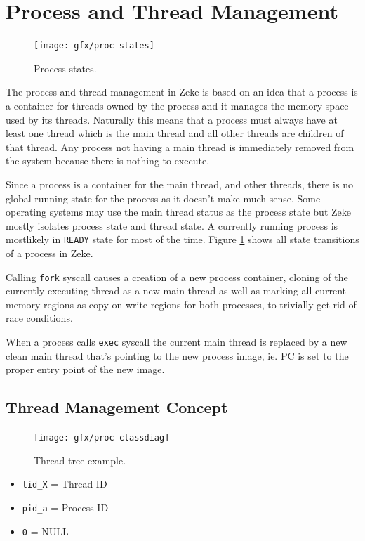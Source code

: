 \part{Process and Thread Management}

\begin{figure}
  \center
  \texttt{[image: gfx/proc-states]}
  \caption{Process states.}
  \label{figure:procstates}
\end{figure}

The process and thread management in Zeke is based on an idea that
a process is a container for threads owned by the process and it manages
the memory space used by its threads. Naturally this means that a process
must always have at least one thread which is the main thread and all other
threads are children of that thread. Any process not having a main thread is
immediately removed from the system because there is nothing to execute.

Since a process is a container for the main thread, and other threads, there
is no global running state for the process as it doesn't make much sense.
Some operating systems may use the main thread status as the process state
but Zeke mostly isolates process state and thread state. A currently running
process is mostlikely in \verb+READY+ state for most of the time. Figure
\ref{figure:procstates} shows all state transitions of a process in Zeke.

Calling \verb+fork+ syscall causes a creation of a new process container,
cloning of the currently executing thread as a new main thread as well as
marking all current memory regions as copy-on-write regions for both processes,
to trivially get rid of race conditions.

When a process calls \verb+exec+ syscall the current main thread is replaced by
a new clean main thread that's pointing to the new process image, ie. \acs{PC}
is set to the proper entry point of the new image.

\chapter{Thread Management Concept}

\begin{figure}
  \center
  \texttt{[image: gfx/proc-classdiag]}
  \caption{Thread tree example.}
  \label{figure:thtree}
\end{figure}

\begin{itemize}
  \item \verb+tid_X+ = Thread ID
  \item \verb+pid_a+ = Process ID
  \item \verb+0+ = NULL
\end{itemize}

